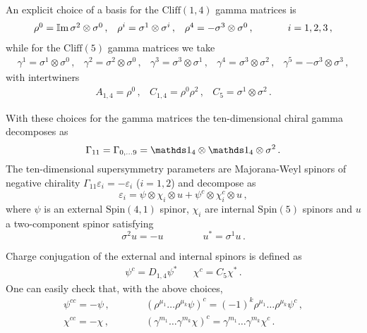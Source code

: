 \documentclass[debug]{phd}
\begin{document}
An explicit choice of a basis for the $\mathrm{Cliff}(1,4)$ gamma matrices is
\begin{equation}
\label{ads5gamma}
	\begin{array}{ccccc}
		\rho^0=\IIm \sigma^2 \otimes \sigma^0\, , & \rho^i = \sigma^1 \otimes \sigma^i\, , & \rho^4=-\sigma^3 \otimes \sigma^0\, , &\phantom{\mbox{and}} & i=1,2,3 \, ,
	\end{array}
\end{equation}
while for the $\mathrm{Cliff}(5)$ gamma matrices we take 
\begin{equation}
	\begin{array}{ccccc}
		\gamma^1=\sigma^1 \otimes \sigma^0\, , & \gamma^2=\sigma^2 \otimes \sigma^0\, , & \gamma^3=\sigma^3 \otimes \sigma^1\, , & \gamma^4=\sigma^3 \otimes \sigma^2\, , & \gamma^5=-\sigma^3 \otimes \sigma^3\, , 
	\end{array}
\end{equation}
with intertwiners 
\begin{equation*}
	\begin{array}{ccc}
		A_{1,4}=\rho^0\, , & C_{1,4}=\rho^0 \rho^2\, ,& C_5=\sigma^1 \otimes \sigma^2\, .
	\end{array}
\end{equation*}


With these choices for the gamma matrices the ten-dimensional chiral gamma decomposes as 
\begin{equation}
	\Gamma_{11} = \Gamma_{0, \ldots 9} = \id_4 \otimes \id_4 \otimes \sigma^2 \, . 
\end{equation}
The ten-dimensional supersymmetry parameters are Majorana-Weyl spinors of negative chirality $\Gamma_{11} \varepsilon_i = - \varepsilon_i$ ($i=1,2$) and decompose as
\begin{equation}
	\varepsilon_i = \psi \otimes \chi_i \otimes u + \psi^c \otimes \chi_i^c \otimes u\, ,
\end{equation}
%
where $\psi$ is an external $\mathrm{Spin}(4,1)$ spinor, $\chi_i$ are internal $\mathrm{Spin}(5)$ spinors and $u$ a two-component spinor satisfying
\begin{equation}
	\sigma^2 u = - u \qquad \qquad u^* = \sigma^1 u \, . 
\end{equation}

Charge conjugation of the external and internal spinors is defined as
%
\begin{align}
	\psi^c= D_{1,4} \psi^* && \chi^c= C_5 \chi^* \, . 
\end{align}
%
One can easily check that, with the above choices, 
%
\begin{equation}
\label{eq:IIB_spinor_cc_properties}
	\begin{array}{lcl}
		\psi^{cc}=-\psi\, , & \quad \quad & \left( \rho^{\mu_1} \ldots \rho^{\mu_k}\psi\right)^c= \left( -1\right)^k \rho^{\mu_1} \ldots \rho^{\mu_k} \psi^c \, , \\
		\chi^{cc}=-\chi\, , & \quad \quad & \left( \gamma^{m_1} \ldots \gamma^{m_k} \chi\right)^c= \gamma^{m_1} \ldots \gamma^{m_k} \chi^c\, .
	\end{array}
\end{equation}
%
\end{document}

